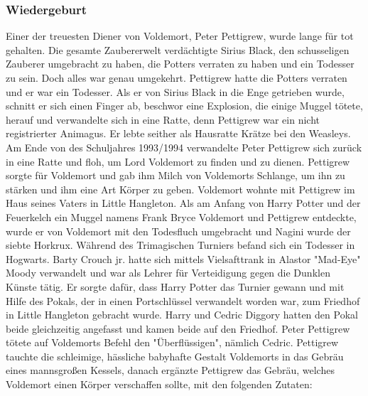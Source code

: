\documentclass[a4paper, 10pt]{article}
\begin{document}
\subsubsection*{\large Wiedergeburt}
Einer der treuesten Diener von Voldemort, Peter Pettigrew, wurde lange für tot gehalten. Die gesamte Zaubererwelt verdächtigte Sirius Black, den schusseligen Zauberer umgebracht zu haben, die Potters verraten zu haben und ein Todesser zu sein. Doch alles war genau umgekehrt. Pettigrew hatte die Potters verraten und er war ein Todesser. Als er von Sirius Black in die Enge getrieben wurde, schnitt er sich einen Finger ab, beschwor eine Explosion, die einige Muggel tötete, herauf und verwandelte sich in eine Ratte, denn Pettigrew war ein nicht registrierter Animagus. Er lebte seither als Hausratte Krätze bei den Weasleys.
\vspace{10pt}
\newline
Am Ende von des Schuljahres 1993/1994 verwandelte Peter Pettigrew sich zurück in eine Ratte und floh, um Lord Voldemort zu finden und zu dienen.
\vspace{10pt}
\newline
Pettigrew sorgte für Voldemort und gab ihm Milch von Voldemorts Schlange, um ihn zu stärken und ihm eine Art Körper zu geben. Voldemort wohnte mit Pettigrew im Haus seines Vaters in Little Hangleton. Als am Anfang von Harry Potter und der Feuerkelch ein Muggel namens Frank Bryce Voldemort und Pettigrew entdeckte, wurde er von Voldemort mit den Todesfluch umgebracht und Nagini wurde der siebte Horkrux.
\vspace{10pt}
\newline
Während des Trimagischen Turniers befand sich ein Todesser in Hogwarts. Barty Crouch jr. hatte sich mittels Vielsafttrank in Alastor "Mad-Eye" Moody verwandelt und war als Lehrer für Verteidigung gegen die Dunklen Künste tätig. Er sorgte dafür, dass Harry Potter das Turnier gewann und mit Hilfe des Pokals, der in einen Portschlüssel verwandelt worden war, zum Friedhof in 
Little Hangleton gebracht wurde. Harry und Cedric Diggory hatten den Pokal beide gleichzeitig angefasst und kamen beide auf den Friedhof. Peter Pettigrew tötete auf Voldemorts Befehl den "Überflüssigen", nämlich Cedric.
\vspace{10pt}
\newline
Pettigrew tauchte die schleimige, hässliche babyhafte Gestalt Voldemorts in das Gebräu eines mannsgroßen Kessels, danach ergänzte Pettigrew das Gebräu, welches Voldemort einen Körper verschaffen sollte, mit den folgenden Zutaten:
\end{document}
